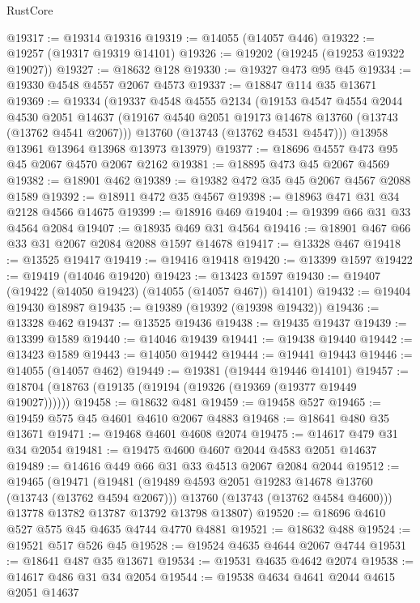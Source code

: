 \begin{lexlean}{RustCore}
\begin{coremodule}
@19317 := @19314 @19316
@19319 := @14055 (@14057 @446)
@19322 := @19257 (@19317 @19319 @14101)
@19326 := @19202 (@19245 (@19253 @19322 @19027))
@19327 := @18632 @128
@19330 := @19327 @473 @95 @45
@19334 := @19330 @4548 @4557 @2067 @4573
@19337 := @18847 @114 @35 @13671
@19369 := @19334
    (@19337
      @4548
      @4555
      @2134
      (@19153
        @4547
        @4554
        @2044
        @4530
        @2051
        @14637
        (@19167 @4540 @2051 @19173 @14678 @13760 (@13743 (@13762 @4541 @2067)))
        @13760
        (@13743 (@13762 @4531 @4547)))
      @13958
      @13961
      @13964
      @13968
      @13973
      @13979)
@19377 := @18696 @4557 @473 @95 @45 @2067 @4570 @2067 @2162
@19381 := @18895 @473 @45 @2067 @4569
@19382 := @18901 @462
@19389 := @19382 @472 @35 @45 @2067 @4567 @2088 @1589
@19392 := @18911 @472 @35 @4567
@19398 := @18963 @471 @31 @34 @2128 @4566 @14675
@19399 := @18916 @469
@19404 := @19399 @66 @31 @33 @4564 @2084
@19407 := @18935 @469 @31 @4564
@19416 := @18901 @467 @66 @33 @31 @2067 @2084 @2088 @1597 @14678
@19417 := @13328 @467
@19418 := @13525 @19417
@19419 := @19416 @19418
@19420 := @13399 @1597
@19422 := @19419 (@14046 @19420)
@19423 := @13423 @1597
@19430 := @19407 (@19422 (@14050 @19423) (@14055 (@14057 @467)) @14101)
@19432 := @19404 @19430 @18987
@19435 := @19389 (@19392 (@19398 @19432))
@19436 := @13328 @462
@19437 := @13525 @19436
@19438 := @19435 @19437
@19439 := @13399 @1589
@19440 := @14046 @19439
@19441 := @19438 @19440
@19442 := @13423 @1589
@19443 := @14050 @19442
@19444 := @19441 @19443
@19446 := @14055 (@14057 @462)
@19449 := @19381 (@19444 @19446 @14101)
@19457 := @18704 (@18763 (@19135 (@19194 (@19326 (@19369 (@19377 @19449 @19027))))))
@19458 := @18632 @481
@19459 := @19458 @527
@19465 := @19459 @575 @45 @4601 @4610 @2067 @4883
@19468 := @18641 @480 @35 @13671
@19471 := @19468 @4601 @4608 @2074
@19475 := @14617 @479 @31 @34 @2054
@19481 := @19475 @4600 @4607 @2044 @4583 @2051 @14637
@19489 := @14616 @449 @66 @31 @33 @4513 @2067 @2084 @2044
@19512 := @19465
    (@19471
      (@19481
        (@19489 @4593 @2051 @19283 @14678 @13760 (@13743 (@13762 @4594 @2067)))
        @13760
        (@13743 (@13762 @4584 @4600)))
      @13778
      @13782
      @13787
      @13792
      @13798
      @13807)
@19520 := @18696 @4610 @527 @575 @45 @4635 @4744 @4770 @4881
@19521 := @18632 @488
@19524 := @19521 @517 @526 @45
@19528 := @19524 @4635 @4644 @2067 @4744
@19531 := @18641 @487 @35 @13671
@19534 := @19531 @4635 @4642 @2074
@19538 := @14617 @486 @31 @34 @2054
@19544 := @19538 @4634 @4641 @2044 @4615 @2051 @14637

\end{coremodule}
\end{lexlean}
